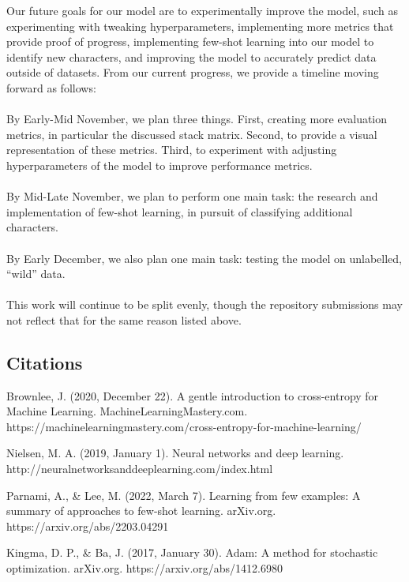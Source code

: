 \documentclass{article}
\begin{document}
Our future goals for our model are to experimentally improve the model, such as experimenting with tweaking hyperparameters, implementing more metrics that provide proof of progress, implementing few-shot learning into our model to identify new characters, and improving the model to accurately predict data outside of datasets. From our current progress, we provide a timeline moving forward as follows:\\\\

By Early-Mid November, we plan three things. First, creating more evaluation metrics, in particular the discussed stack matrix. Second, to provide a visual representation of these metrics. Third, to experiment with adjusting hyperparameters of the model to improve performance metrics.\\\\

By Mid-Late November, we plan to perform one main task: the research and implementation of few-shot learning, in pursuit of classifying additional characters.\\\\

By Early December, we also plan one main task: testing the model on unlabelled, ``wild'' data.\\\\

This work will continue to be split evenly, though the repository submissions may not reflect that for the same reason listed above.
\pagebreak
\subsection*{Citations}
\begin{hangparas}{0.5 in}{1}
Brownlee, J. (2020, December 22). A gentle introduction to cross-entropy for Machine Learning. MachineLearningMastery.com. https://machinelearningmastery.com/cross-entropy-for-machine-learning/\newline

Nielsen, M. A. (2019, January 1). Neural networks and deep learning. http://neuralnetworksanddeeplearning.com/index.html\newline

Parnami, A., \& Lee, M. (2022, March 7). Learning from few examples: A summary of approaches to few-shot learning. arXiv.org. https://arxiv.org/abs/2203.04291\newline

Kingma, D. P., \& Ba, J. (2017, January 30). Adam: A method for stochastic optimization. arXiv.org. https://arxiv.org/abs/1412.6980\newline
\end{hangparas}
\end{document}
